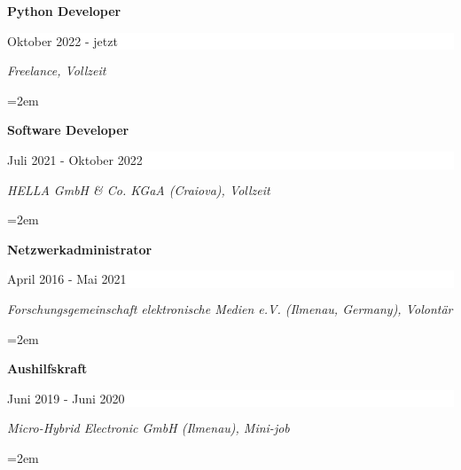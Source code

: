 \documentclass[paper=a4,fontsize=10.4pt]{scrartcl} %
\newcommand{\sepspace}{\vspace*{0.5em}}		%
\newcommand{\EducationEntry}[4]{
		\noindent \textbf{#1} \hfill      %
		\colorbox{White}{%
			\parbox{16em}{%
			\hfill\color{Black}#2}} \par  %
		\noindent \textit{#3} \par        %
		\noindent\hangindent=2em\hangafter=0 \small #4 %
		\normalsize \par}
\begin{document}
\EducationEntry{\color[HTML]{6a040f}Python Developer}{Oktober 2022 - jetzt}{Freelance, Vollzeit}{%
}
\sepspace
\EducationEntry{\color[HTML]{6a040f}Software Developer}{Juli 2021 - Oktober 2022}{HELLA GmbH \& Co. KGaA (Craiova), Vollzeit}{%
}
\sepspace
\EducationEntry{\color[HTML]{6a040f}Netzwerkadministrator}{April 2016 - Mai 2021}{Forschungsgemeinschaft elektronische Medien e.V. (Ilmenau, Germany), Volontär}{%
}
\sepspace
\EducationEntry{\color[HTML]{6a040f}Aushilfskraft}{Juni 2019 - Juni 2020}{Micro-Hybrid Electronic GmbH (Ilmenau), Mini-job}{%
%
}
\end{document}
